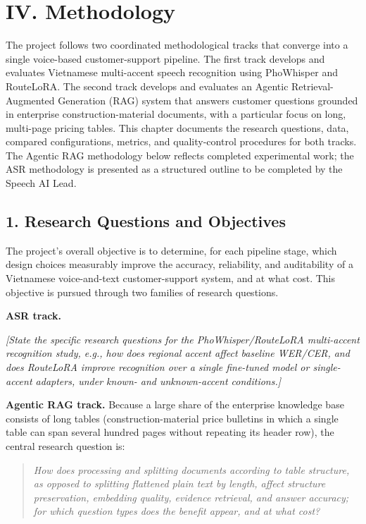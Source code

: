 \documentclass[11pt,a4paper]{article}
\newcommand{\guidance}[1]{%
  {\color{guidanceblue}\itshape [#1]\par}%
}
\newcommand{\chapterstart}[1]{\clearpage\section{#1}}
\begin{document}
\chapterstart{IV. Methodology}

The project follows two coordinated methodological tracks that converge into a
single voice-based customer-support pipeline. The first track develops and
evaluates Vietnamese multi-accent speech recognition using PhoWhisper and
RouteLoRA. The second track develops and evaluates an Agentic Retrieval-
Augmented Generation (RAG) system that answers customer questions grounded in
enterprise construction-material documents, with a particular focus on
long, multi-page pricing tables. This chapter documents the research
questions, data, compared configurations, metrics, and quality-control
procedures for both tracks. The Agentic RAG methodology below reflects
completed experimental work; the ASR methodology is presented as a
structured outline to be completed by the Speech AI Lead.

\subsection{1. Research Questions and Objectives}

The project's overall objective is to determine, for each pipeline stage,
which design choices measurably improve the accuracy, reliability, and
auditability of a Vietnamese voice-and-text customer-support system, and at
what cost. This objective is pursued through two families of research
questions.

\textbf{ASR track.} \guidance{State the specific research questions for the
PhoWhisper/RouteLoRA multi-accent recognition study, e.g., how does regional
accent affect baseline WER/CER, and does RouteLoRA improve recognition over a
single fine-tuned model or single-accent adapters, under known- and
unknown-accent conditions.}

\textbf{Agentic RAG track.} Because a large share of the enterprise knowledge
base consists of long tables (construction-material price bulletins in which
a single table can span several hundred pages without repeating its header
row), the central research question is:

\begin{quote}
\itshape How does processing and splitting documents according to table
structure, as opposed to splitting flattened plain text by length, affect
structure preservation, embedding quality, evidence retrieval, and answer
accuracy; for which question types does the benefit appear, and at what cost?
\end{quote}
\end{document}
